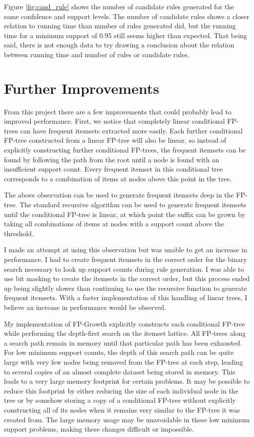 \documentclass[11pt]{article}
\begin{document}
Figure \ref{fig:cand_rule} shows the number of candidate rules generated for the same confidence and support
levels. The number of candidate rules shows a closer relation to running time than number of rules generated did, but the running time for a minimum
support of 0.95 still seems higher than expected. That being said, there is not enough data to try drawing a conclusion about the relation between
running time and number of rules or candidate rules.

\section{Further Improvements}
From this project there are a few improvements that could probably lead to improved performance. First, we notice that completely linear conditional
FP-trees can have frequent itemsets extracted more easily. Each further conditional FP-tree constructed from a linear FP-tree will also be linear, so
instead of explicitly constructing further conditional FP-trees, the frequent itemsets can be found by following the path from the root until a node
is found with an insufficient support count. Every frequent itemset in this conditional tree corresponds to a combination of items at nodes above this
point in the tree.

The above observation can be used to generate frequent itemsets deep in the FP-tree. The standard recursive algorithm can be used to generate frequent
itemsets until the conditional FP-tree is linear, at which point the suffix can be grown by taking all combinations of items at nodes with a support
count above the threshold.

I made an attempt at using this observation but was unable to get an increase in performance. I had to create frequent itemsets in the correct order
for the binary search necessary to look up support counts during rule generation. I was able to use bit masking to create the itemsets in the correct
order, but this process ended up being slightly slower than continuing to use the recursive function to generate frequent itemsets. With a faster
implementation of this handling of linear trees, I believe an increase in performance would be observed.

My implementation of FP-Growth explicitly constructs each conditional FP-tree while performing the depth-first search on the itemset lattice. All FP-trees
along a search path remain in memory until that particular path has been exhausted. For low
minimum support counts, the depth of this search path can be quite large with very few nodes being removed from the FP-tree at each step, leading to
several copies of an almost complete dataset being stored in memory. This leads to a very large memory footprint for certain problems. It may be
possible to reduce this footprint by either reducing the size of each individual node in the tree or by somehow storing a copy of a conditional
FP-tree without explicitly constructing all of its nodes when it remains very similar to the FP-tree it was created from. The large memory usage may
be unavoidable in these low minimum support problems, making these changes difficult or impossible.
\end{document}
